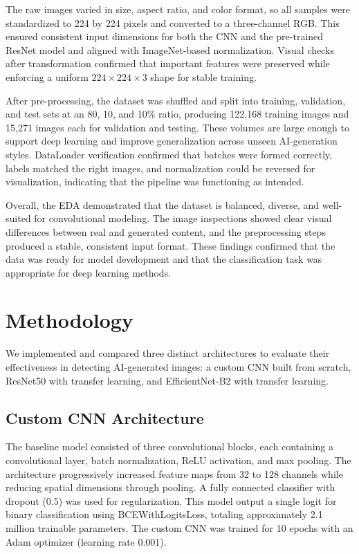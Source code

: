 \documentclass[man,12pt,letterpaper,donotrepeattitle,floatsintext]{apa7}
\begin{document}
The raw images varied in size, aspect ratio, and color format, so all samples were 
standardized to 224 by 224 pixels and converted to a three-channel RGB. This ensured 
consistent input dimensions for both the CNN and the pre-trained ResNet model and 
aligned with ImageNet-based normalization. Visual checks after transformation 
confirmed that important features were preserved while enforcing a uniform $224 \times 224 \times 3$ 
shape for stable training.

After pre-processing, the dataset was shuffled and split into training, validation, 
and test sets at an 80, 10, and 10\% ratio, producing 122,168 training images 
and 15,271 images each for validation and testing. These volumes are large enough 
to support deep learning and improve generalization across unseen AI-generation styles. 
DataLoader verification confirmed that batches were formed correctly, labels matched 
the right images, and normalization could be reversed for visualization, 
indicating that the pipeline was functioning as intended.

Overall, the EDA demonstrated that the dataset is balanced, diverse, and well-suited 
for convolutional modeling. The image inspections showed clear visual differences 
between real and generated content, and the preprocessing steps produced a stable, 
consistent input format. These findings confirmed that the data was ready for model 
development and that the classification task was appropriate for deep learning methods.

\section{Methodology}
\label{methodology}

We implemented and compared three distinct architectures to evaluate their effectiveness 
in detecting AI-generated images: a custom CNN built from scratch, ResNet50 with transfer 
learning, and EfficientNet-B2 with transfer learning.

\subsection{Custom CNN Architecture}
The baseline model consisted of three convolutional blocks, each containing a convolutional 
layer, batch normalization, ReLU activation, and max pooling. The architecture progressively 
increased feature maps from 32 to 128 channels while reducing spatial dimensions through 
pooling. A fully connected classifier with dropout (0.5) was used for regularization. 
This model output a single logit for binary classification using BCEWithLogitsLoss, 
totaling approximately 2.1 million trainable parameters. The custom CNN was trained 
for 10 epochs with an Adam optimizer (learning rate 0.001).
\end{document}

